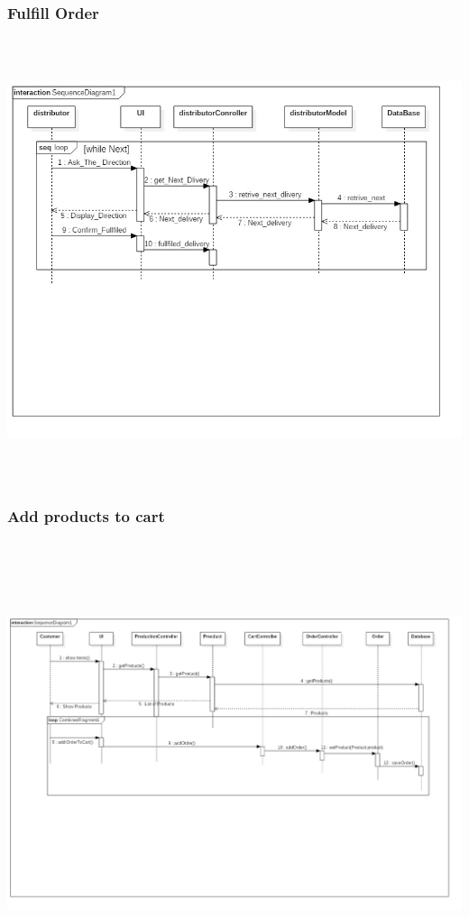 \documentclass[12pt]{article}
\begin{document}
\subsubsection{ Fulfill Order }
\begin{center}
	\includegraphics[width=17cm,height=13cm]{./assets/sequencediagram/fulfills.png}\\
\end{center}

\subsubsection{ Add products to cart }
\begin{center}
	\includegraphics[width=17cm,height=13cm]{./assets/sequencediagram/addproductstocart.png}\\
\end{center}
\end{document}

